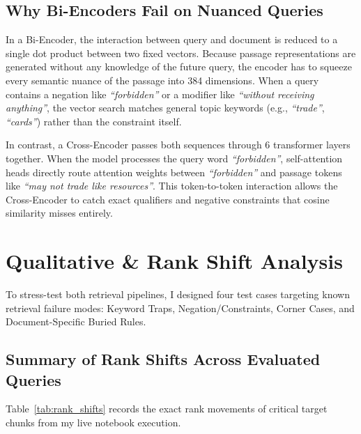 \documentclass[11pt,a4paper]{article}
\begin{document}
\subsection{Why Bi-Encoders Fail on Nuanced Queries}
In a Bi-Encoder, the interaction between query and document is reduced to a single dot product between two fixed vectors. Because passage representations are generated without any knowledge of the future query, the encoder has to squeeze every semantic nuance of the passage into 384 dimensions. When a query contains a negation like \textit{``forbidden''} or a modifier like \textit{``without receiving anything''}, the vector search matches general topic keywords (e.g., \textit{``trade''}, \textit{``cards''}) rather than the constraint itself.

In contrast, a Cross-Encoder passes both sequences through 6 transformer layers together. When the model processes the query word \textit{``forbidden''}, self-attention heads directly route attention weights between \textit{``forbidden''} and passage tokens like \textit{``may not trade like resources''}. This token-to-token interaction allows the Cross-Encoder to catch exact qualifiers and negative constraints that cosine similarity misses entirely.

\clearpage
\section{Qualitative \& Rank Shift Analysis}

To stress-test both retrieval pipelines, I designed four test cases targeting known retrieval failure modes: Keyword Traps, Negation/Constraints, Corner Cases, and Document-Specific Buried Rules.

\subsection{Summary of Rank Shifts Across Evaluated Queries}

Table~\ref{tab:rank_shifts} records the exact rank movements of critical target chunks from my live notebook execution.
\end{document}
